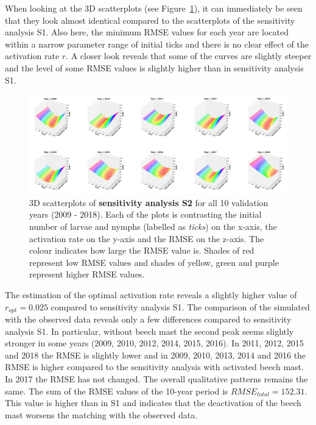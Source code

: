 \documentclass[a4paper, 11pt]{scrartcl}
\begin{document}
When looking at the 3D scatterplots (see Figure~\ref{fig:S2_2009_2018_rmse}), it can immediately be seen that they look almost identical compared to the scatterplots of the sensitivity analysis S1. Also here, the minimum RMSE values for each year are located within a narrow parameter range of initial ticks and there is no clear effect of the activation rate $r$. A closer look reveals that some of the curves are slightly steeper and the level of some RMSE values is slightly higher than in sensitivity analysis S1.

\begin{figure}[h!]
\centering
\includegraphics[width=\linewidth]{figures/S2_2009_2018_rmse}
\caption{3D scatterplots of \textbf{sensitivity analysis S2} for all 10 validation years (2009 - 2018). Each of the plots is contrasting the initial number of larvae and nymphs (labelled as \textit{ticks}) on the x-axis, the activation rate on the y-axis and the RMSE on the z-axis. The colour indicates how large the RMSE value is. Shades of red represent low RMSE values and shades of yellow, green and purple represent higher RMSE values.}
\label{fig:S2_2009_2018_rmse}
\end{figure}

The estimation of the optimal activation rate reveals a slightly higher value of $r_{opt} = 0.025$ compared to sensitivity analysis S1. The comparison of the simulated with the observed data reveals only a few differences compared to sensitivity analysis S1. In particular, without beech mast the second peak seems slightly stronger in some years (2009, 2010, 2012, 2014, 2015, 2016). In 2011, 2012, 2015 and 2018 the RMSE is slightly lower and in 2009, 2010, 2013, 2014 and 2016 the RMSE is higher compared to the sensitivity analysis with activated beech mast. In 2017 the RMSE has not changed. The overall qualitative patterns remains the same. The sum of the RMSE values of the 10-year period is $RMSE_{total} = 152.31$. This value is higher than in S1 and indicates that the deactivation of the beech mast worsens the matching with the observed data.
\end{document}
